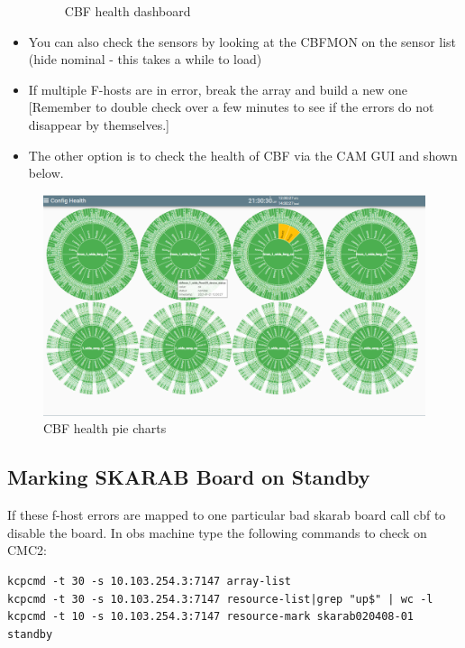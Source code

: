 \begin{itemize}
\begin{figure}[!thb]
	\caption{CBF health dashboard}
	\label{fig:image40}
\end{figure}

\item{} You can also check the sensors by looking at the CBFMON on the sensor list (hide nominal - this takes a while to load)
\item{} If multiple F-hosts are in error, break the array and build a new one [Remember to double check over a few minutes to see if the errors do not disappear by themselves.]
\item{} The other option is to check the health of CBF via the CAM GUI and shown below.

\end{itemize}


\begin{figure}[!thb]
	\centering
	\includegraphics[scale=0.26]{Chapters/images/image91.png}
	
	\caption{CBF health pie charts}
	\label{fig:image91}
\end{figure}

\subsection{ Marking SKARAB Board on Standby}	
If these f-host errors are mapped to one particular bad skarab board call cbf to disable the board.
In obs machine type the following commands to check on CMC2:
\begin{lstlisting}[style=DOS]
kcpcmd -t 30 -s 10.103.254.3:7147 array-list
kcpcmd -t 30 -s 10.103.254.3:7147 resource-list|grep "up$" | wc -l 
kcpcmd -t 10 -s 10.103.254.3:7147 resource-mark skarab020408-01 standby 
\end{lstlisting}

